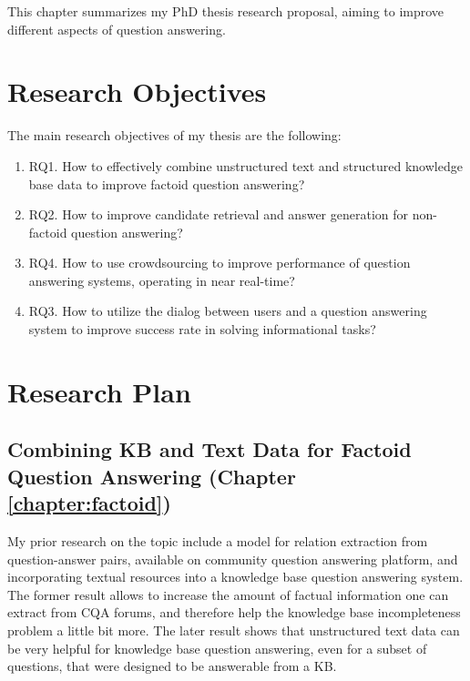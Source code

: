 %

\label{chapter:proposal}

\noindent

This chapter summarizes my PhD thesis research proposal, aiming to improve different aspects of question answering.

\section{Research Objectives}
\label{section:proposal:objectives}

The main research objectives of my thesis are the following:

\begin{enumerate}
\item RQ1. How to effectively combine unstructured text and structured knowledge base data to improve factoid question answering?
\item RQ2. How to improve candidate retrieval and answer generation for non-factoid question answering?
\item RQ4. How to use crowdsourcing to improve performance of question answering systems, operating in near real-time?
\item RQ3. How to utilize the dialog between users and a question answering system to improve success rate in solving informational tasks?
\end{enumerate}

\section{Research Plan}
\label{section:proposal:plan}

\subsection{Combining KB and Text Data for Factoid Question Answering (Chapter \ref{chapter:factoid})}
\label{section:proposal:plan:factoid}

My prior research on the topic include a model for relation extraction from question-answer pairs, \eg available on community question answering platform, and incorporating textual resources into a knowledge base question answering system.
The former result allows to increase the amount of factual information one can extract from CQA forums, and therefore help the knowledge base incompleteness problem a little bit more.
The later result shows that unstructured text data can be very helpful for knowledge base question answering, even for a subset of questions, that were designed to be answerable from a KB.

